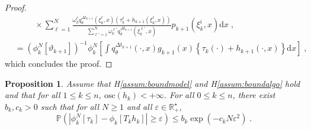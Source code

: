 \documentclass[12pt]{article}
\newcommand{\rmd}{\mathrm{d}}
\newcommand{\eqsp}{\;}
\newcommand{\1}{\mathrm{1}}
\newtheorem{proposition}{Proposition}
\begin{document}
\begin{proof}
\begin{align*}
&\hspace{1cm}\times \sum_{\ell=1}^N\frac{\omega_k^{\ell}q_{\theta}^{\Delta t_{k+1}}(\xi_{k}^{\ell},x)\left(\tau^{\ell}_k + h_{k+1}(\xi_{k}^{\ell},x)\right)}{\sum_{\ell'=1}^N\omega_k^{\ell'}q_{\theta}^{\Delta t_{k+1}}(\xi_{k}^{\ell'},x)}p_{k+1}(\xi_{k}^{i},x)\rmd x\eqsp,\\
& =\left(\phi^N_{k}[\vartheta_{k+1}]\right)^{-1}\phi^N_{k}\left[\int q_{\theta}^{\Delta t_{k+1}}(\cdot,x)g_{k+1}(x)\left\{\tau_k(\cdot) + h_{k+1}(\cdot,x)\right\}\rmd x\right]\eqsp,
\end{align*}
which concludes the proof.
\end{proof}

\begin{proposition}
Assume that H\ref{assum:boundmodel} and H\ref{assum:boundalgo} hold and that for all $1\le k\le n$, $\mathrm{osc}(h_k)<+\infty$. For all $0\le k\le n$, there exist $b_k,c_k>0$ such that for all $N\ge 1$ and all $\varepsilon\in\mathbb{R}_+^\star$,
\[
\mathbb{P}\left(\left|\phi_k^N[\tau_k] - \phi_k\left[T_kh_k\right]\right|\ge \varepsilon\right)\le b_k\exp\left(-c_kN\varepsilon^2\right)\eqsp.
\]
\end{proposition}
\end{document}

